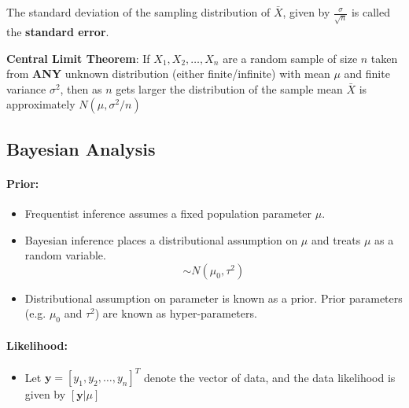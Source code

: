 \documentclass{article}
\begin{document}
The standard deviation of the sampling distribution of $\bar{X}$, given by $\frac{\sigma}{\sqrt{n}}$ is called the \textbf{standard error}.

\textbf{Central Limit Theorem}: If $X_1,X_2,\ldots,X_n$ are a random sample of size $n$ taken from \textbf{ANY} unknown distribution (either finite/infinite) with mean $\mu$ and finite variance $\sigma^2$, then as $n$ gets larger the distribution of the sample mean $\bar{X}$ is approximately $N(\mu, \sigma^2/n)$

\subsection{Bayesian Analysis}
\paragraph{Prior:}
\begin{itemize}
    \item Frequentist inference assumes a fixed population parameter $\mu$.
    \item Bayesian inference places a distributional assumption on $\mu$ and treats $\mu$ as a random variable.
    \begin{equation}
        [\mu]\sim N(\mu_0, \tau^2)
    \end{equation}
    \item Distributional assumption on parameter is known as a prior. Prior parameters (e.g. $\mu_0$ and $\tau^2$) are known as hyper-parameters.
\end{itemize}

\paragraph{Likelihood:}
\begin{itemize}
    \item Let $\mathbf{y} = [y_1, y_2, \ldots, y_n]^T$ denote the vector of data, and the data likelihood is given by $[\mathbf{y}|\mu]$
\end{itemize}
\end{document}
